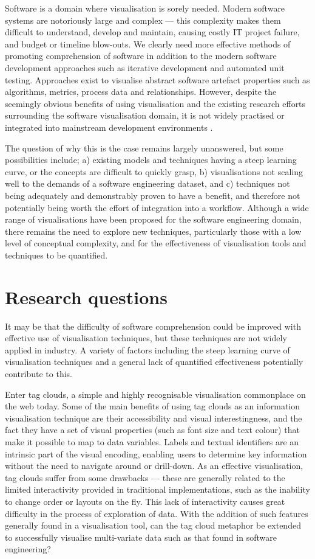Software is a domain where visualisation is sorely needed. Modern software systems are notoriously large and complex --- this complexity makes them difficult to understand, develop and maintain, causing costly IT project failure, and budget or timeline blow-outs. We clearly need more effective methods of promoting comprehension of software in addition to the modern software development approaches such as iterative development and automated unit testing. Approaches exist to visualise abstract software artefact properties such as algorithms, metrics, process data and relationships. However, despite the seemingly obvious benefits of using visualisation and the existing research efforts surrounding the software visualisation domain, it is not widely practised or integrated into mainstream development environments \citep{reiss05}.

The question of why this is the case remains largely unanswered, but some possibilities include; a) existing models and techniques having a steep learning curve, or the concepts are difficult to quickly grasp, b) visualisations not scaling well to the demands of a software engineering dataset, and c) techniques not being adequately and demonstrably proven to have a benefit, and therefore not potentially being worth the effort of integration into a workflow. Although a wide range of visualisations have been proposed for the software engineering domain, there remains the need to explore new techniques, particularly those with a low level of conceptual complexity, and for the effectiveness of visualisation tools and techniques to be quantified.

\section{Research questions}

It may be that the difficulty of software comprehension could be improved with effective use of visualisation techniques, but these techniques are not widely applied in industry. A variety of factors including the steep learning curve of visualisation techniques and a general lack of quantified effectiveness potentially contribute to this.

Enter tag clouds, a simple and highly recognisable visualisation commonplace on the web today. Some of the main benefits of using tag clouds as an information visualisation technique are their accessibility and visual interestingness, and the fact they have a set of visual properties (such as font size and text colour) that make it possible to map to data variables. Labels and textual identifiers are an intrinsic part of the visual encoding, enabling users to determine key information without the need to navigate around or drill-down. As an effective visualisation, tag clouds suffer from some drawbacks --- these are generally related to the limited interactivity provided in traditional implementations, such as the inability to change order or layouts on the fly. This lack of interactivity causes great difficulty in the process of exploration of data.  With the addition of such features generally found in a visualisation tool, can the tag cloud metaphor be extended to successfully visualise multi-variate data such as that found in software engineering? 


